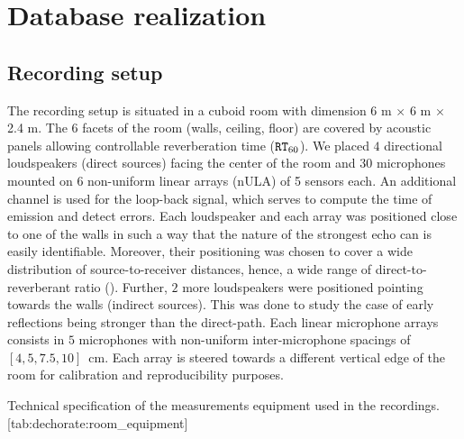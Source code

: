 \section{Database realization}
\subsection{Recording setup}
The recording setup is situated in a cuboid room with dimension 6 m $\times$ 6 m $\times$ 2.4 m.
The 6 facets of the room (walls, ceiling, floor) are covered by acoustic panels allowing controllable reverberation time ($\mathtt{RT}_{60}$).
We placed $4$ directional loudspeakers (direct sources) facing the center of the room and $30$ microphones mounted on 6 non-uniform linear arrays (nULA) of 5 sensors each.
An additional channel is used for the loop-back signal, which serves to compute the time of emission and detect errors.
Each loudspeaker and each array was positioned close to one of the walls in such a way that the nature of the strongest echo can is easily identifiable.
Moreover, their positioning was chosen to cover a wide distribution of source-to-receiver distances, hence, a wide range of direct-to-reverberant ratio (\DRR).
Further, $2$ more loudspeakers were positioned pointing towards the walls (indirect sources).
This was done to study the case of early reflections being stronger than the direct-path.
Each linear microphone arrays consists in $5$ microphones with non-uniform inter-microphone spacings of $[4, 5, 7.5, 10]$~cm.
Each array is steered towards a different vertical edge of the room for calibration and reproducibility purposes.


\begin{table}[h]
    \begin{sidecaption}[]{
        Technical specification of the measurements equipment used in the recordings.
        }[tab:dechorate:room_equipment]
        \centering
        \small
        
    \end{sidecaption}
\end{table}

